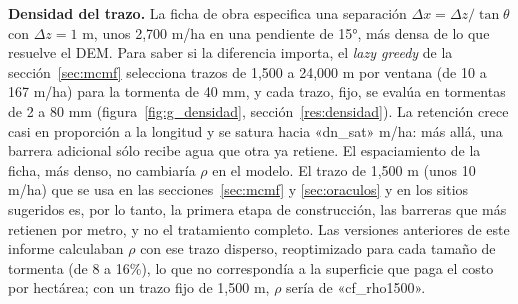 \textbf{Densidad del trazo.} La ficha de obra especifica una separación $\Delta x=\Delta z/\tan\theta$ con $\Delta z=1$ m, unos 2,700 m/ha en una pendiente de 15°, más densa de lo que resuelve el DEM. Para saber si la diferencia importa, el \emph{lazy greedy} de la sección~\ref{sec:mcmf} selecciona trazos de 1,500 a 24,000 m por ventana (de 10 a 167 m/ha) para la tormenta de 40 mm, y cada trazo, fijo, se evalúa en tormentas de 2 a 80 mm (figura~\ref{fig:g_densidad}, sección~\ref{res:densidad}). La retención crece casi en proporción a la longitud y se satura hacia «dn_sat» m/ha: más allá, una barrera adicional sólo recibe agua que otra ya retiene. El espaciamiento de la ficha, más denso, no cambiaría $\rho$ en el modelo. El trazo de 1,500 m (unos 10 m/ha) que se usa en las secciones~\ref{sec:mcmf} y \ref{sec:oraculos} y en los sitios sugeridos es, por lo tanto, la primera etapa de construcción, las barreras que más retienen por metro, y no el tratamiento completo. Las versiones anteriores de este informe calculaban $\rho$ con ese trazo disperso, reoptimizado para cada tamaño de tormenta (de 8 a 16\%), lo que no correspondía a la superficie que paga el costo por hectárea; con un trazo fijo de 1,500 m, $\rho$ sería de «cf_rho1500».

